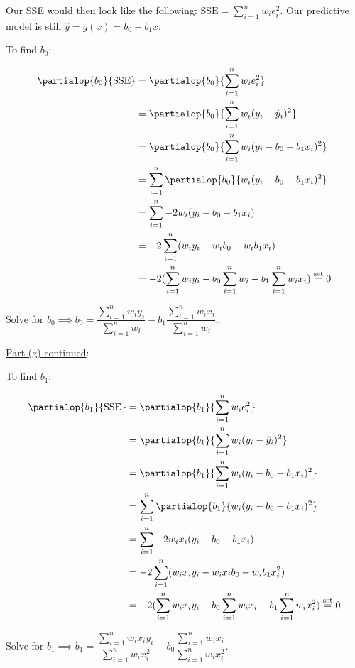 \documentclass[12pt]{article}
\newcommand{\snmath}{\displaystyle\sum_{i=1}^n}
\begin{document}
\begin{enumerate}
\begin{tcolorbox}[colback=white, sharp corners]
Our SSE would then look like the following: $\mathrm{SSE} = \snmath w_i e_i^2$. Our predictive model is still $\hat{y} = g(x) = b_0 + b_1 x$.

To find $b_0$:

\begin{align*}
	\partialop{b_0}{\mathrm{SSE}} &= \partialop{b_0}{\snmath w_i e_i^2} \\
	&= \partialop{b_0}{\snmath w_i (y_i - \hat{y}_i)^2} \\
	&= \partialop{b_0}{\snmath w_i (y_i - b_0 - b_1 x_i)^2} \\
	&= \snmath \partialop{b_0}{ w_i (y_i - b_0 - b_1 x_i)^2} \\
	&= \snmath -2 w_i (y_i - b_0 - b_1 x_i) \\
	&= -2 \snmath( w_i y_i - w_i b_0 - w_i b_1 x_i)\\
	&= -2 ( \snmath w_i y_i - b_0 \snmath w_i  - b_1 \snmath w_i x_i) \overset{\mathrm{set}}{=} 0
\end{align*}

Solve for $b_0 \implies b_0 = \dfrac{\snmath w_i y_i}{\snmath w_i} - b_1 \dfrac{\snmath w_i x_i}{\snmath w_i}$.

\end{tcolorbox}

\newpage

\begin{tcolorbox}[colback = white, sharp corners]

\underline{Part (g) continued}: 

\vspace{3mm}

To find $b_1$:

\begin{align*}
	\partialop{b_1}{\mathrm{SSE}} &= \partialop{b_1}{\snmath w_i e_i^2} \\
	&= \partialop{b_1}{\snmath w_i (y_i - \hat{y}_i)^2} \\
	&= \partialop{b_1}{\snmath w_i (y_i - b_0 - b_1 x_i)^2} \\
	&= \snmath \partialop{b_1}{ w_i (y_i - b_0 - b_1 x_i)^2} \\
	&= \snmath -2  w_i x_i (y_i - b_0 - b_1 x_i) \\
	&= -2 \snmath( w_i x_i y_i - w_i x_i b_0 - w_i b_1 x_i^2)\\
	&= -2 ( \snmath w_i x_i y_i - b_0 \snmath w_i x_i  - b_1 \snmath w_i x_i^2) \overset{\mathrm{set}}{=} 0
\end{align*}

Solve for $b_1 \implies b_1 = \dfrac{\snmath w_i x_i y_i}{\snmath w_i x_i^2} - b_0 \dfrac{\snmath w_i x_i}{\snmath w_i x_i^2}$.


\end{tcolorbox}
\end{enumerate}
\end{document}
